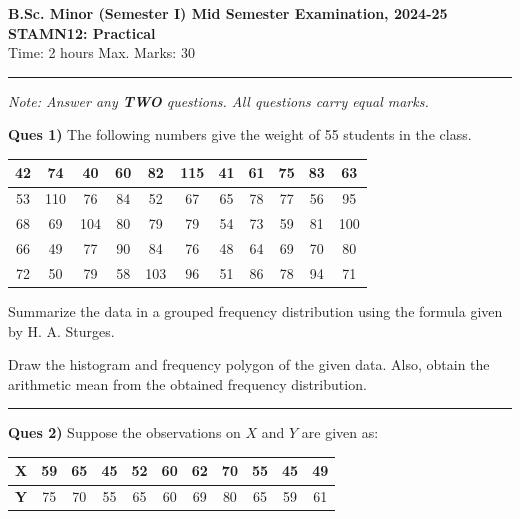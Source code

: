 \documentclass[11pt,a4paper]{article}
\begin{document}
\begin{center}
  {\large\bfseries B.Sc. Minor (Semester I) Mid Semester Examination, 2024-25}\\[4pt]
  {\large\bfseries STAMN12: Practical}\\[4pt]
  {\normalsize Time: 2 hours \hfill Max. Marks: 30}
\end{center}

\rule{\linewidth}{0.4pt}\smallskip



\noindent   \textit{Note: Answer any   \textbf{TWO} questions. All questions carry equal marks.}
\bigskip




\noindent   \textbf{Ques 1)} The following numbers give the weight of 55 students in the class.


\begin{center}
\small

\begin{tabular}{|c|c|c|c|c|c|c|c|c|c|c|}
\hline
42 & 74 & 40 & 60 & 82 & 115 & 41 & 61 & 75 & 83 & 63 \\ \hline
53 & 110 & 76 & 84 & 52 & 67 & 65 & 78 & 77 & 56 & 95 \\ \hline
68 & 69 & 104 & 80 & 79 & 79 & 54 & 73 & 59 & 81 & 100 \\ \hline
66 & 49 & 77 & 90 & 84 & 76 & 48 & 64 & 69 & 70 & 80 \\ \hline
72 & 50 & 79 & 58 & 103 & 96 & 51 & 86 & 78 & 94 & 71 \\ \hline
\end{tabular}
\end{center}


\begin{parts}
  \item Summarize the data in a grouped frequency distribution using the formula given by H. A. Sturges.
  \item Draw the histogram and frequency polygon of the given data. Also, obtain the arithmetic mean from the obtained frequency distribution.
\end{parts}

\medskip\rule{\linewidth}{0.2pt}\medskip




\noindent   \textbf{Ques 2)} Suppose the observations on $X$ and $Y$ are given as:


\begin{center}
\small

\begin{tabular}{|c|c|c|c|c|c|c|c|c|c|c|}
\hline
   \textbf{X} & 59 & 65 & 45 & 52 & 60 & 62 & 70 & 55 & 45 & 49 \\ \hline
   \textbf{Y} & 75 & 70 & 55 & 65 & 60 & 69 & 80 & 65 & 59 & 61 \\ \hline
\end{tabular}
\end{center}
\end{document}
